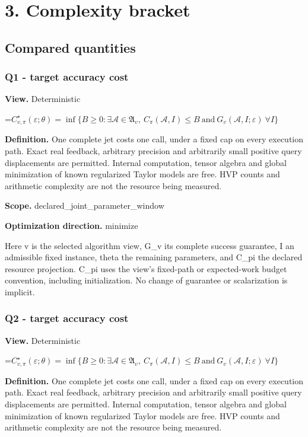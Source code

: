 \documentclass[10pt,a4paper]{article}
\newcommand{\AtlasMath}[1]{\par\begingroup\centering\setbox0=\hbox{$\displaystyle #1$}\ifdim\wd0>1.4\linewidth\typeout{ATLAS WIDE FORMULA: \the\wd0}\fi\ifdim\wd0>\linewidth\resizebox{\linewidth}{!}{\box0}\else\box0\fi\par\endgroup}
\begin{document}
\section{3. Complexity bracket}
\subsection{Compared quantities}
\subsubsection{Q1 - target accuracy cost}
\textbf{View.} Deterministic

\AtlasMath{C^\star_{v,\pi}(\varepsilon;\theta)=\inf\{B\ge0:\exists\mathcal A\in\mathfrak A_v,\ C_\pi(\mathcal A,I)\le B\ \text{and}\ G_v(\mathcal A,I;\varepsilon)\ \forall I\}}
\textbf{Definition.} One complete jet costs one call, under a fixed cap on every execution path. Exact real feedback, arbitrary precision and arbitrarily small positive query displacements are permitted. Internal computation, tensor algebra and global minimization of known regularized Taylor models are free. HVP counts and arithmetic complexity are not the resource being measured.

\textbf{Scope.} declared\_\allowbreak{}joint\_\allowbreak{}parameter\_\allowbreak{}window

\textbf{Optimization direction.} minimize

Here v is the selected algorithm view, G\_\allowbreak{}v its complete success guarantee, I an admissible fixed instance, theta the remaining parameters, and C\_\allowbreak{}pi the declared resource projection. C\_\allowbreak{}pi uses the view's fixed-path or expected-work budget convention, including initialization. No change of guarantee or scalarization is implicit.

\subsubsection{Q2 - target accuracy cost}
\textbf{View.} Deterministic

\AtlasMath{C^\star_{v,\pi}(\varepsilon;\theta)=\inf\{B\ge0:\exists\mathcal A\in\mathfrak A_v,\ C_\pi(\mathcal A,I)\le B\ \text{and}\ G_v(\mathcal A,I;\varepsilon)\ \forall I\}}
\textbf{Definition.} One complete jet costs one call, under a fixed cap on every execution path. Exact real feedback, arbitrary precision and arbitrarily small positive query displacements are permitted. Internal computation, tensor algebra and global minimization of known regularized Taylor models are free. HVP counts and arithmetic complexity are not the resource being measured.
\end{document}
